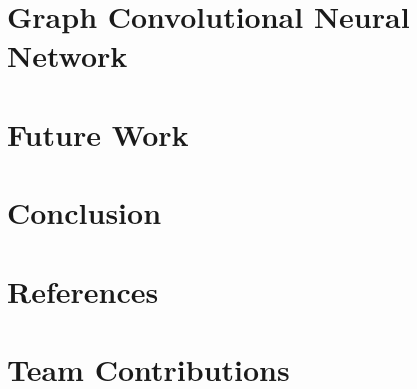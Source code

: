 \documentclass[twoside,twocolumn]{article}
\begin{document}
\section{Graph Convolutional Neural Network}
\label{sec:graph_GCN}


\section{Future Work}
\label{sec:future_work}


\section{Conclusion}
\label{sec:conclusion}


\section{References}
\label{sec:ref}


\section*{Team Contributions}
\label{sec:team}


% 
%
\end{document}
